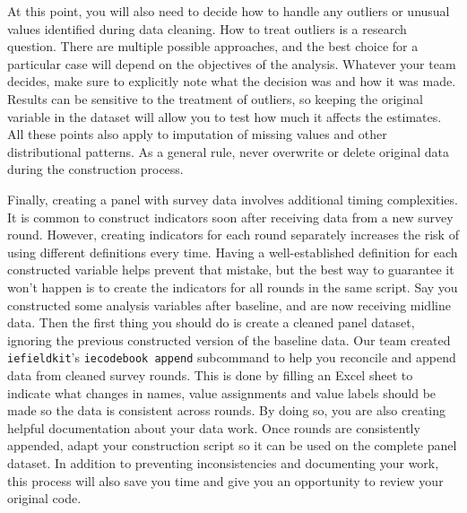 At this point, you will also need to decide how to handle any outliers or unusual values identified during data cleaning. 
How to treat outliers is a research question.
There are multiple possible approaches, 
and the best choice for a particular case will depend on the objectives of the analysis.
Whatever your team decides, make sure to explicitly note what the decision was and how it was made.
Results can be sensitive to the treatment of outliers,
so keeping the original variable in the dataset will allow you to test how much it affects the estimates.
All these points also apply to imputation of missing values and other distributional patterns.
As a general rule, never overwrite or delete original data during the construction process.

Finally, creating a panel with survey data involves additional timing complexities.
It is common to construct indicators soon after receiving data from a new survey round.
However, creating indicators for each round separately increases the risk of using different definitions every time.
Having a well-established definition for each constructed variable helps prevent that mistake,
but the best way to guarantee it won't happen is to create the indicators for all rounds in the same script.
Say you constructed some analysis variables after baseline, and are now receiving midline data.
Then the first thing you should do is create a cleaned panel dataset,
ignoring the previous constructed version of the baseline data.
Our team created \texttt{iefieldkit}'s \texttt{iecodebook append} subcommand
to help you reconcile and append data from cleaned survey rounds.
This is done by filling an Excel sheet to indicate what changes in
names, value assignments and value labels should be made so the data is consistent across rounds.
By doing so, you are also creating helpful documentation about your data work.
Once rounds are consistently appended, 
adapt your construction script so it can be used on the complete panel dataset.
In addition to preventing inconsistencies and documenting your work,
this process will also save you time and give you an opportunity to review your original code.


